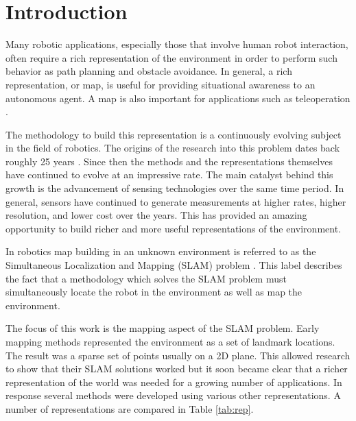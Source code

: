 
\section{Introduction} \label{sec:introduction}

Many robotic applications, especially those that involve human robot interaction, often require a rich representation of the environment in order to perform such behavior as path planning and obstacle avoidance. In general, a rich representation, or map, is useful for providing situational awareness to an autonomous agent. A map is also important for applications such as teleoperation \cite{Kadous2006}.

The methodology to build this
representation is a continuously evolving subject in the field of robotics.
The origins of the research into this problem dates back roughly 25 years \cite{Lorensen1987}.
Since then the methods and the representations themselves have continued to
evolve at an impressive rate. The main catalyst behind this growth is the
advancement of sensing technologies over the same time period. In general,
sensors have continued to generate measurements at higher rates, higher
resolution, and lower cost over the years. This has provided an amazing
opportunity to build richer and more useful representations of the
environment.

In robotics map building in an unknown environment is referred to as
the Simultaneous Localization and Mapping (SLAM) problem \cite{Thrun2002}. This label
describes the fact that a methodology which solves the SLAM problem must
simultaneously locate the robot in the environment as well as map the
environment.

The focus of this work is the mapping aspect of the SLAM problem.
Early mapping methods represented
the environment as a set of landmark locations. The result was a sparse set
of points usually on a 2D plane. This allowed research to show that their
SLAM solutions worked but it soon became clear that a richer representation
of the world was needed for a growing number of applications. In response
several methods were developed using various other representations.  A
number of representations are compared in Table \ref{tab:rep}.


